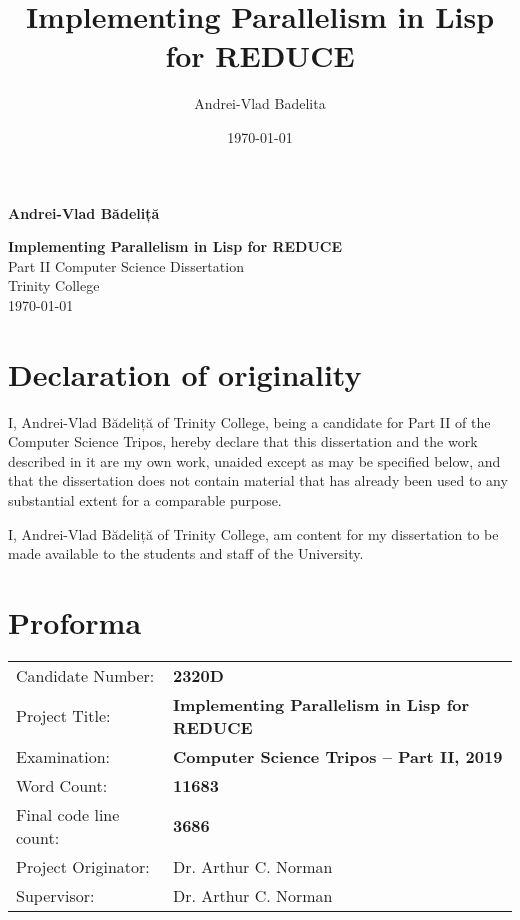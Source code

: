 \documentclass[a4paper,12pt,twoside,openright]{report}
\date{\today}
\title{Implementing Parallelism in Lisp for REDUCE}
\author{Andrei-Vlad Badelita}
\begin{document}

\hfill{\LARGE \bf Andrei-Vlad Bădeliță}

\pagestyle{empty}

\vspace*{60mm}
\begin{center}
\Huge{\bf Implementing Parallelism in Lisp for REDUCE} \\
\vspace*{5mm}
Part II Computer Science Dissertation \\
\vspace*{5mm}
Trinity College \\
\vspace*{5mm}
\today  %
\end{center}

\cleardoublepage


\pagestyle{plain}

\section*{Declaration of originality}

I, Andrei-Vlad Bădeliță of Trinity College, being a candidate for Part II of the
Computer Science Tripos, hereby declare that this dissertation and the work described
in it are my own work, unaided except as may be specified below, and that the
dissertation does not contain material that has already been used to any
substantial extent for a comparable purpose.

\medskip
\noindent
I, Andrei-Vlad Bădeliță of Trinity College, am content for my dissertation
to be made available to the students and staff of the University.

\bigskip
{}

\medskip
{}

\section*{Proforma}

{\large
\begin{tabular}{ll}
Candidate Number:   & \bf 2320D \\
Project Title:      & \bf Implementing Parallelism in Lisp for REDUCE \\
Examination:        & \bf Computer Science Tripos -- Part II, 2019  \\
Word Count:         & \bf 11683          \\
Final code line count: & \bf 3686        \\
Project Originator: & Dr. Arthur C. Norman                    \\
Supervisor:         & Dr. Arthur C. Norman                    \\
\end{tabular}
}
\end{document}

